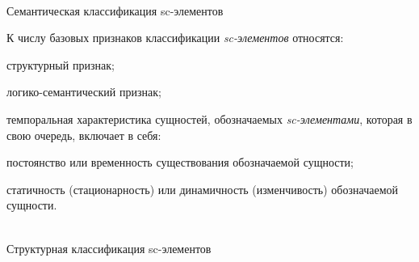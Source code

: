 \begin{frame}{\\Семантическая классификация sc-элементов}

К числу базовых признаков классификации \textit{sc-элементов} относятся:
\begin{textitemize}
	\item структурный признак;
	\item логико-семантический признак;
	\item темпоральная характеристика сущностей, обозначаемых \textit{sc-элементами}, которая в свою очередь, включает в себя:
	\begin{textitemize}
		\item постоянство или временность существования обозначаемой сущности;
		\item статичность (стационарность) или динамичность (изменчивость) обозначаемой сущности.
	\end{textitemize}
\end{textitemize}
\end{frame}

\begin{frame}{\\Структурная классификация sc-элементов}
	\vspace{10mm}
	\begin{SCn}
		\begin{scnindent}
			\begin{scneqtoset}
				\begin{scnindent}
					\begin{scneqtoset}
					\end{scneqtoset}
				\end{scnindent}
			\end{scneqtoset}
		\end{scnindent} 
	\end{SCn}
\end{frame}

